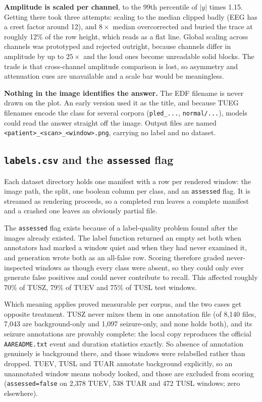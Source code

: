 \documentclass[11pt,a4paper]{article}
\newcommand{\file}[1]{{\small\texttt{#1}}}
\begin{document}
\textbf{Amplitude is scaled per channel}, to the 99th percentile of $|y|$ times
1.15. Getting there took three attempts: scaling to the median clipped badly
(EEG has a crest factor around 12), and $8\times$ median overcorrected and buried
the trace at roughly 12\% of the row height, which reads as a flat line. Global
scaling across channels was prototyped and rejected outright, because channels
differ in amplitude by up to $25\times$ and the loud ones become unreadable solid
blocks. The trade is that cross-channel amplitude comparison is lost, so
asymmetry and attenuation cues are unavailable and a scale bar would be
meaningless.

\textbf{Nothing in the image identifies the answer.} The EDF filename is never
drawn on the plot. An early version used it as the title, and because TUEG
filenames encode the class for several corpora (\texttt{pled\_...},
\texttt{normal/...}), models could read the answer straight off the image. Output
files are named \texttt{<patient>\_<scan>\_<window>.png}, carrying no label and no
dataset.

\subsection{\file{labels.csv} and the \texttt{assessed} flag}

Each dataset directory holds one manifest with a row per rendered window: the
image path, the split, one boolean column per class, and an \texttt{assessed}
flag. It is streamed as rendering proceeds, so a completed run leaves a complete
manifest and a crashed one leaves an obviously partial file.

The \texttt{assessed} flag exists because of a label-quality problem found after
the images already existed. The label function returned an empty set both when
annotators had marked a window quiet and when they had never examined it, and
generation wrote both as an all-false row. Scoring therefore graded
never-inspected windows as though every class were absent, so they could only
ever generate false positives and could never contribute to recall. This affected
roughly 70\% of TUSZ, 79\% of TUEV and 75\% of TUSL test windows.

Which meaning applies proved measurable per corpus, and the two cases get
opposite treatment. TUSZ never mixes them in one annotation file (of 8{,}140
files, 7{,}043 are background-only and 1{,}097 seizure-only, and none holds
both), and its seizure annotations are provably complete: the local copy
reproduces the official \file{AAREADME.txt} event and duration statistics exactly.
So absence of annotation genuinely is background there, and those windows were
relabelled rather than dropped. TUEV, TUSL and TUAR annotate background
explicitly, so an unannotated window means nobody looked, and those are excluded
from scoring (\texttt{assessed=false} on 2{,}378 TUEV, 538 TUAR and 472 TUSL
windows; zero elsewhere).
\end{document}
